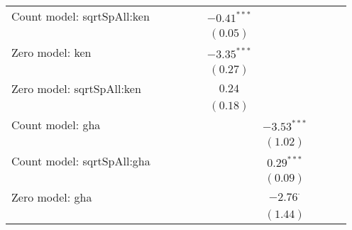 \begin{table}
\begin{center}
{\begin{tabular}{l c c c c c c c c c}
Count model: sqrtSpAll:ken     &                &                &                &                 & $-0.41^{***}$  &                 &                 &                 &                \\
                               &                &                &                &                 & $(0.05)$       &                 &                 &                 &                \\
Zero model: ken                &                &                &                &                 & $-3.35^{***}$  &                 &                 &                 &                \\
                               &                &                &                &                 & $(0.27)$       &                 &                 &                 &                \\
Zero model: sqrtSpAll:ken      &                &                &                &                 & $0.24$         &                 &                 &                 &                \\
                               &                &                &                &                 & $(0.18)$       &                 &                 &                 &                \\
Count model: gha               &                &                &                &                 &                & $-3.53^{***}$   &                 &                 &                \\
                               &                &                &                &                 &                & $(1.02)$        &                 &                 &                \\
Count model: sqrtSpAll:gha     &                &                &                &                 &                & $0.29^{***}$    &                 &                 &                \\
                               &                &                &                &                 &                & $(0.09)$        &                 &                 &                \\
Zero model: gha                &                &                &                &                 &                & $-2.76^{\cdot}$ &                 &                 &                \\
                               &                &                &                &                 &                & $(1.44)$        &                 &                 &                \\

\end{tabular}}
\end{center}
\end{table}
